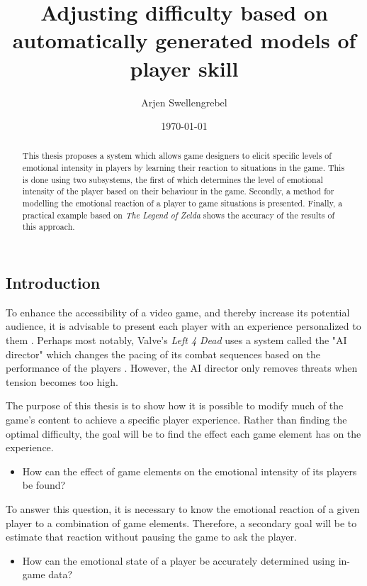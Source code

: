 \documentclass[a4paper]{article}
\title{Adjusting difficulty based on automatically generated models of player skill}
\author{Arjen Swellengrebel}
\date{\today}
\begin{document}
\maketitle

\begin{multicols*}{2}
\begin{abstract}
This thesis proposes a system which allows game designers to elicit specific levels of emotional intensity in players by learning their reaction to situations in the game.
This is done using two subsystems, the first of which determines the level of emotional intensity of the player based on their behaviour in the game.
Secondly, a method for modelling the emotional reaction of a player to game situations is presented.
Finally, a practical example based on \emph{The Legend of Zelda} shows the accuracy of the results of this approach.
\end{abstract}

\section{Introduction}
To enhance the accessibility of a video game, and thereby increase its potential audience, it is advisable to present each player with an experience personalized to them \cite{playercentered}. Perhaps most notably, Valve's \emph{Left 4 Dead} uses a system called the "AI director" which changes the pacing of its combat sequences based on the performance of the players \cite{left4dead}. However, the AI director only removes threats when tension becomes too high.

The purpose of this thesis is to show how it is possible to modify much of the game's content to achieve a specific player experience. Rather than finding the optimal difficulty, the goal will be to find the effect each game element has on the experience.
\begin{itemize} \item[\textbf{1.}] How can the effect of game elements on the emotional intensity of its players be found? \end{itemize}
To answer this question, it is necessary to know the emotional reaction of a given player to a combination of game elements. Therefore, a secondary goal will be to estimate that reaction without pausing the game to ask the player.
\begin{itemize} \item[\textbf{2.}] How can the emotional state of a player be accurately determined using in-game data? \end{itemize}


\end{multicols*}
\end{document}
